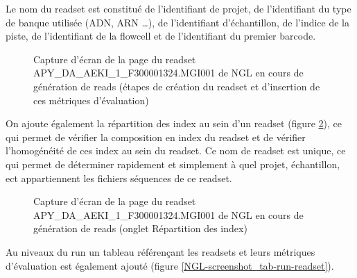 Le nom du readset est constitué de l'identifiant de projet, de l'identifiant du type de banque utilisée (ADN, ARN \dots), de l'identifiant d'échantillon, de l'indice de la piste, de l'identifiant de la flowcell et de l'identifiant du premier barcode.

\begin{figure}[H]
    \centering
    \caption{\footnotesize{Capture d'écran de la page du readset APY\_DA\_AEKI\_1\_F300001324.MGI001 de NGL en cours de génération de reads (étapes de création du readset et d'insertion de ces métriques d'évaluation)}}
    \label{NGL-screenshot_readset}
\end{figure}

On ajoute également la répartition des index au sein d'un readset (figure \ref{NGL-screenshot_readset-index}), ce qui permet de vérifier la composition en index du readset et de vérifier l'homogénéité de ces index au sein du readset.
Ce nom de readset est unique, ce qui permet de déterminer rapidement et simplement à quel projet, échantillon, ect appartiennent les fichiers séquences de ce readset.

\begin{figure}[H]
    \centering
    \caption{\footnotesize{Capture d'écran de la page du readset APY\_DA\_AEKI\_1\_F300001324.MGI001 de NGL en cours de génération de reads (onglet \og Répartition des index\fg{})}}
    \label{NGL-screenshot_readset-index}
\end{figure}

Au niveaux du run un tableau référençant les readsets et leurs métriques d'évaluation est également ajouté (figure \ref{NGL-screenshot_tab-run-readset}).

